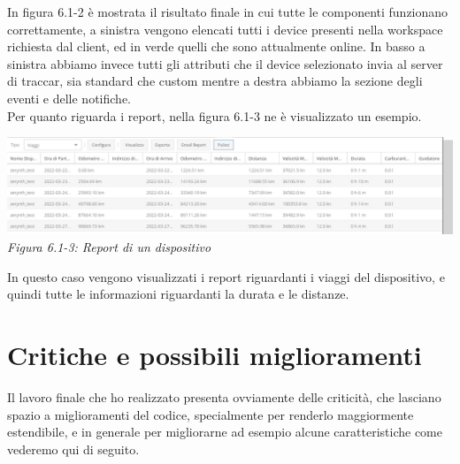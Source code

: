 \documentclass[a4paper,titlepage,12pt]{book}
\begin{document}
{In figura 6.1-2 è mostrata il risultato finale in cui tutte le componenti funzionano correttamente, a sinistra vengono elencati tutti i device presenti nella workspace richiesta dal client, ed in verde quelli che sono attualmente online. In basso a sinistra abbiamo invece tutti gli attributi che il device selezionato invia al server di traccar, sia standard che custom mentre a destra abbiamo la sezione degli eventi e delle notifiche.\\
Per quanto riguarda i report, nella figura 6.1-3 ne è visualizzato un esempio.

\begin{center}
\includegraphics[scale=0.3]{images/reports.png}\\ 
\textit{Figura 6.1-3: Report di un dispositivo}
\end{center}

In questo caso vengono visualizzati i report riguardanti i viaggi del dispositivo, e quindi tutte le informazioni riguardanti la durata e le distanze.


\section{
Critiche e possibili miglioramenti}
Il lavoro finale che ho realizzato presenta ovviamente delle criticità, che lasciano spazio a miglioramenti del codice, specialmente per renderlo maggiormente estendibile, e in generale per migliorarne ad esempio alcune caratteristiche come vederemo qui di seguito.\\

}
\end{document}
